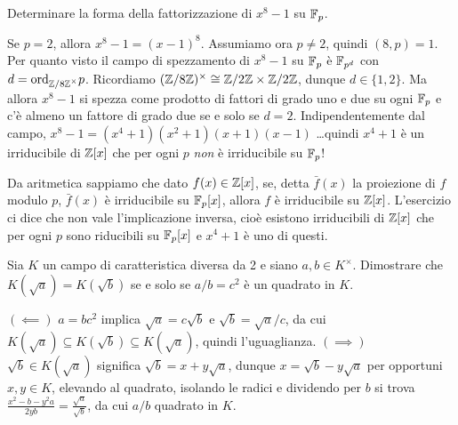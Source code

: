 \begin{exercise}
    Determinare la forma della fattorizzazione di $x^8 - 1$ su $\mathbb{F}_p$.
\end{exercise}
\begin{solution}
    Se $p = 2$, allora $x^8 - 1 = (x - 1)^8$. Assumiamo ora $p \neq 2$, quindi $(8, p) = 1$. Per quanto visto il campo di spezzamento di $x^8 - 1$ su $\mathbb{F}_p$ è $\mathbb{F}_{p^d}$ con $d = \text{ord}_{{\mathbb{Z}/8\mathbb{Z}}^\times}p$. Ricordiamo $(\mathbb{Z}/8\mathbb{Z})^\times \cong \mathbb{Z}/2\mathbb{Z} \times \mathbb{Z}/2\mathbb{Z}$, dunque $d \in \{ 1, 2 \}$.
    Ma allora $x^8 - 1$ si spezza come prodotto di fattori di grado uno e due su ogni $\mathbb{F}_p$ e c'è almeno un fattore di grado due se e solo se $d = 2$.
    Indipendentemente dal campo, $x^8 - 1 = (x^4 + 1)(x^2 + 1)(x + 1)(x - 1)$ \dots quindi $x^4 + 1$ è un irriducibile di $\mathbb{Z}[x]$ che per ogni $p$ \textit{non} è irriducibile su $\mathbb{F}_p$!

    Da aritmetica sappiamo che dato $f(x) \in \mathbb{Z}[x]$, se, detta $\bar f(x)$ la proiezione di $f$ modulo $p$, $\bar f(x)$ è irriducibile su $\mathbb{F}_p[x]$, allora $f$ è irriducibile su $\mathbb{Z}[x]$. L'esercizio ci dice che non vale l'implicazione inversa, cioè esistono irriducibili di $\mathbb{Z}[x]$ che per ogni $p$ sono riducibili su $\mathbb{F}_p[x]$ e $x^4 + 1$ è uno di questi.
\end{solution}

\begin{exercise}
    Sia $K$ un campo di caratteristica diversa da 2 e siano $a, b \in K^\times$. Dimostrare che $K(\sqrt{a}) = K(\sqrt{b})$ se e solo se $a/b = c^2$ è un quadrato in $K$.
\end{exercise}
\begin{solution}
    $(\impliedby)$ $a = b c^2$ implica  $\sqrt{a} = c \sqrt{b}$ e $\sqrt{b} = \sqrt{a}/c$, da cui $K(\sqrt{a}) \subseteq K(\sqrt{b}) \subseteq K(\sqrt{a})$, quindi l'uguaglianza.
    $(\implies)$ $\sqrt{b} \in K(\sqrt{a})$ significa $\sqrt{b} = x + y \sqrt{a}$, dunque $x = \sqrt{b} - y\sqrt{a}$ per opportuni $x, y \in K$, elevando al quadrato, isolando le radici e dividendo per $b$ si trova $\frac{x^2 - b - y^2 a}{2yb} = \frac{\sqrt{a}}{\sqrt{b}}$, da cui $a/b$ quadrato in $K$.
\end{solution}

